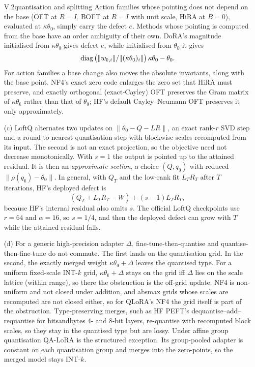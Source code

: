 \begin{proposition}{V.2}{quantisation and splitting}
Action families whose pointing does not depend on the base (OFT at $R=I$, BOFT at $R=I$ with unit scale, HiRA at
$B=0$), evaluated at $\kappa\theta_0$, simply carry the defect $e$. Methods whose pointing is computed from the base
have an order ambiguity of their own. DoRA's magnitude initialised from $\kappa\theta_0$ gives defect $e$, while
initialised from $\theta_0$ it gives
\[\operatorname{diag}\big(\lVert w_{0,i}\rVert/\lVert(\kappa\theta_0)_i\rVert\big)\,\kappa\theta_0-\theta_0.\]
For action families a base change also moves the absolute invariants, along with the base point. NF4's exact zero code
enlarges the zero set that HiRA must preserve, and exactly orthogonal (exact-Cayley) OFT preserves the Gram matrix of
$\kappa\theta_0$ rather than that of $\theta_0$; HF's default Cayley--Neumann OFT preserves it only approximately.

(c) LoftQ alternates two updates on $\lVert\theta_0-Q-LR\rVert$, an exact rank-$r$ SVD step and a round-to-nearest
quantisation step with blockwise scales recomputed from its input. The second is not an exact projection, so the
objective need not decrease monotonically. With $s=1$ the output is pointed up to the attained residual. It is then an
\emph{approximate section}, a choice $(Q,q_0)$ with reduced $\lVert\rho(q_0)-\theta_0\rVert$. In general, with $Q_T$
and the low-rank fit $L_TR_T$ after $T$ iterations, HF's deployed defect is
\[(Q_T+L_TR_T-W)+(s-1)L_TR_T,\]
because HF's internal residual also omits $s$. The official LoftQ checkpoints use $r=64$ and $\alpha=16$, so $s=1/4$,
and then the deployed defect can grow with $T$ while the attained residual falls.

(d) For a generic high-precision adapter $\Delta$, fine-tune-then-quantise and quantise-then-fine-tune do not commute.
The first lands on the quantisation grid. In the second, the exactly merged weight $\kappa\theta_0+\Delta$ leaves the
quantised type. For a uniform fixed-scale INT-$k$ grid, $\kappa\theta_0+\Delta$ stays on the grid iff $\Delta$ lies on
the scale lattice (within range), so there the obstruction is the off-grid update. NF4 is non-uniform and not closed
under addition, and absmax grids whose scales are recomputed are not closed either, so for QLoRA's NF4 the grid itself is
part of the obstruction. Type-preserving merges, such as HF PEFT's dequantise--add--requantise for bitsandbytes 4- and
8-bit layers, re-quantise with recomputed block scales, so they stay in the quantised type but are lossy. Under affine
group quantisation QA-LoRA is the structured exception. Its group-pooled adapter is constant on each quantisation group
and merges into the zero-points, so the merged model stays INT-$k$.
\end{proposition}

